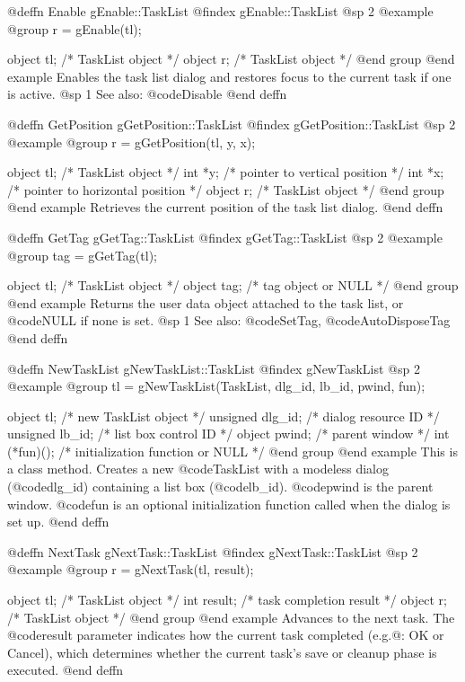@deffn {Enable} gEnable::TaskList
@findex gEnable::TaskList
@sp 2
@example
@group
r = gEnable(tl);

object  tl;   /*  TaskList object  */
object  r;    /*  TaskList object  */
@end group
@end example
Enables the task list dialog and restores focus to the current task
if one is active.
@sp 1
See also:  @code{Disable}
@end deffn



@deffn {GetPosition} gGetPosition::TaskList
@findex gGetPosition::TaskList
@sp 2
@example
@group
r = gGetPosition(tl, y, x);

object  tl;   /*  TaskList object               */
int     *y;   /*  pointer to vertical position   */
int     *x;   /*  pointer to horizontal position  */
object  r;    /*  TaskList object                */
@end group
@end example
Retrieves the current position of the task list dialog.
@end deffn



@deffn {GetTag} gGetTag::TaskList
@findex gGetTag::TaskList
@sp 2
@example
@group
tag = gGetTag(tl);

object  tl;    /*  TaskList object      */
object  tag;   /*  tag object or NULL   */
@end group
@end example
Returns the user data object attached to the task list, or @code{NULL}
if none is set.
@sp 1
See also:  @code{SetTag}, @code{AutoDisposeTag}
@end deffn



@deffn {NewTaskList} gNewTaskList::TaskList
@findex gNewTaskList
@sp 2
@example
@group
tl = gNewTaskList(TaskList, dlg_id, lb_id, pwind, fun);

object    tl;      /*  new TaskList object             */
unsigned  dlg_id;  /*  dialog resource ID               */
unsigned  lb_id;   /*  list box control ID              */
object    pwind;   /*  parent window                    */
int       (*fun)();  /*  initialization function or NULL */
@end group
@end example
This is a class method.  Creates a new @code{TaskList} with a modeless
dialog (@code{dlg_id}) containing a list box (@code{lb_id}).
@code{pwind} is the parent window.  @code{fun} is an optional
initialization function called when the dialog is set up.
@end deffn



@deffn {NextTask} gNextTask::TaskList
@findex gNextTask::TaskList
@sp 2
@example
@group
r = gNextTask(tl, result);

object  tl;       /*  TaskList object         */
int     result;   /*  task completion result  */
object  r;        /*  TaskList object         */
@end group
@end example
Advances to the next task.  The @code{result} parameter indicates how
the current task completed (e.g.@: OK or Cancel), which determines
whether the current task's save or cleanup phase is executed.
@end deffn




